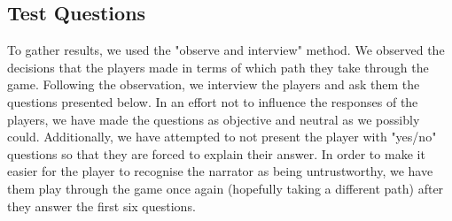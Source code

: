 \subsection{Test Questions}
\label{Method_Questions}
To gather results, we used the "observe and interview" method. We observed the decisions that the players made in terms of which path they take through the game. Following the observation, we interview the players and ask them the questions presented below. In an effort not to influence the responses of the players, we have made the questions as objective and neutral as we possibly could. Additionally, we have attempted to not present the player with "yes/no" questions so that they are forced to explain their answer. In order to make it easier for the player to recognise the narrator as being untrustworthy, we have them play through the game once again (hopefully taking a different path) after they answer the first six questions.

